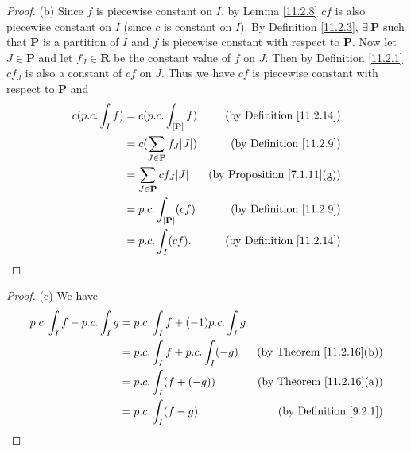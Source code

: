 \begin{proof}{(b)}
    Since \(f\) is piecewise constant on \(I\), by Lemma \ref{11.2.8} \(cf\) is also piecewise constant on \(I\) (since \(c\) is constant on \(I\)).
    By Definition \ref{11.2.3}, \(\exists\ \mathbf{P}\) such that \(\mathbf{P}\) is a partition of \(I\) and \(f\) is piecewise constant with respect to \(\mathbf{P}\).
    Now let \(J \in \mathbf{P}\) and let \(f_J \in \mathbf{R}\) be the constant value of \(f\) on \(J\).
    Then by Definition \ref{11.2.1} \(c f_J\) is also a constant of \(cf\) on \(J\).
    Thus we have \(cf\) is piecewise constant with respect to \(\mathbf{P}\) and
    \begin{align*}
        c (p.c. \int_I f) & = c (p.c. \int_{[\mathbf{P}]} f)           & \text{(by Definition \ref{11.2.14})}    \\
                          & = c (\sum_{J \in \mathbf{P}} f_J \abs*{J}) & \text{(by Definition \ref{11.2.9})}     \\
                          & = \sum_{J \in \mathbf{P}} c f_J \abs*{J}   & \text{(by Proposition \ref{7.1.11}(g))} \\
                          & = p.c. \int_{[\mathbf{P}]} (c f)           & \text{(by Definition \ref{11.2.9})}     \\
                          & = p.c. \int_I (c f).                       & \text{(by Definition \ref{11.2.14})}
    \end{align*}
\end{proof}

\begin{proof}{(c)}
    We have
    \begin{align*}
        p.c. \int_I f - p.c. \int_I g & = p.c. \int_I f + (-1) p.c. \int_I g                                        \\
                                      & = p.c. \int_I f + p.c. \int_I (-g)   & \text{(by Theorem \ref{11.2.16}(b))} \\
                                      & = p.c. \int_I (f + (-g))             & \text{(by Theorem \ref{11.2.16}(a))} \\
                                      & = p.c. \int_I (f - g).               & \text{(by Definition \ref{9.2.1})}
    \end{align*}
\end{proof}

